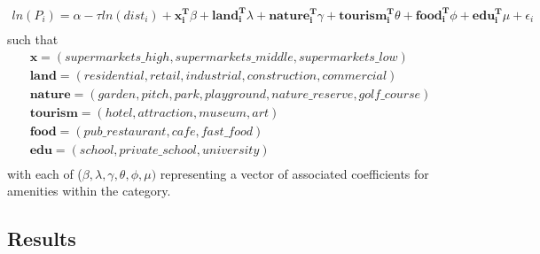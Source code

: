 \documentclass{article}
\begin{document}
\begin{gather*}
ln(P_i) = \alpha - \tau ln(dist_i) + \boldsymbol{x_i^{T}} \beta + \boldsymbol{land_i^{T}}\lambda + \boldsymbol{nature_i^{T}} \gamma + \boldsymbol{tourism_i^{T}} \theta + \boldsymbol{food_i^{T}} \phi + \boldsymbol{edu_i^{T}} \mu + \epsilon_i \\
\end{gather*}
such that
\begin{gather*}
\boldsymbol{x} = (supermarkets\_high, supermarkets\_middle, supermarkets\_low) \\
\boldsymbol{land} = (residential, retail, industrial, construction, commercial) \\
\boldsymbol{nature} = (garden, pitch, park, playground, nature\_reserve, golf\_course) \\
\boldsymbol{tourism} = (hotel, attraction, museum, art) \\
\boldsymbol{food} = (pub\_restaurant, cafe, fast\_food) \\ 
\boldsymbol{edu} = (school, private\_school, university) \\ 
\end{gather*}
with each of ($\beta, \lambda, \gamma, \theta, \phi, \mu)$ representing a vector of associated coefficients for amenities within the category.  


\subsection{Results}
\end{document}
